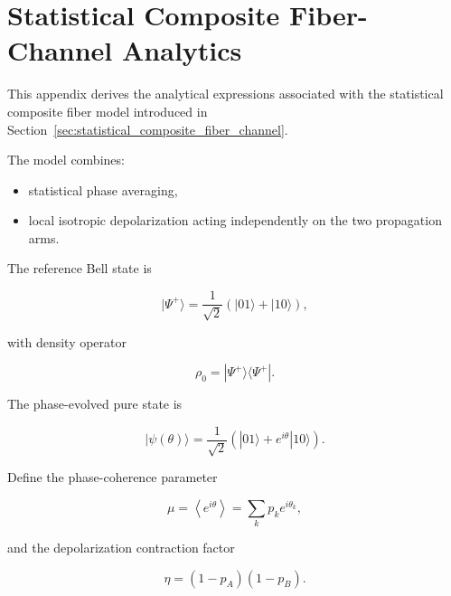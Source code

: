 
\section{Statistical Composite Fiber-Channel Analytics}
\label{app:statistical_composite_channel_analytics}

This appendix derives the analytical expressions associated with the statistical composite fiber model introduced in Section~\ref{sec:statistical_composite_fiber_channel}.

\medskip

The model combines:

\begin{itemize}

\item statistical phase averaging,

\item local isotropic depolarization acting independently on the two propagation arms.

\end{itemize}

\medskip

The reference Bell state is

\[
|\Psi^+\rangle
=
\frac{1}{\sqrt{2}}
\left(
|01\rangle
+
|10\rangle
\right),
\]

with density operator

\[
\rho_0
=
|\Psi^+\rangle
\langle
\Psi^+|.
\]

The phase-evolved pure state is

\begin{equation}
|\psi(\theta)\rangle
=
\frac{1}{\sqrt{2}}
\left(
|01\rangle
+
e^{i\theta}|10\rangle
\right).
\label{eq:appendix_statistical_phase_state}
\end{equation}

\medskip

Define the phase-coherence parameter

\begin{equation}
\mu
=
\left\langle
e^{i\theta}
\right\rangle
=
\sum_k
p_k
e^{i\theta_k},
\label{eq:appendix_mu_definition}
\end{equation}

and the depolarization contraction factor

\begin{equation}
\eta
=
(1-p_A)(1-p_B).
\label{eq:appendix_eta_definition}
\end{equation}

